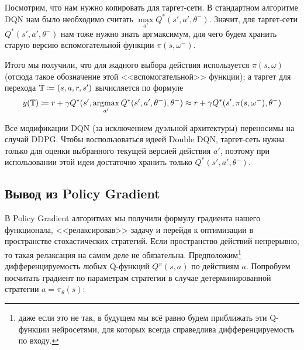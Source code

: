 Посмотрим, что нам нужно копировать для таргет-сети. В стандартном алгоритме DQN нам было необходимо считать $\max\limits_{a'} Q^*(s', a', \theta^{-})$. Значит, для таргет-сети $Q^*(s', a', \theta^{-})$ нам тоже нужно знать аргмаксимум, для чего будем хранить старую версию вспомогательной функции $\pi(s, \omega^{-})$.

Итого мы получили, что для жадного выбора действия используется $\pi(s, \omega)$ (отсюда такое обозначение этой <<вспомогательной>> функции); а таргет для перехода $\mathbb{T} \coloneqq (s, a, r, s')$ вычисляется по формуле
$$y(\mathbb{T}) \coloneqq r + \gamma Q^*(s', \mathop{\mathrm{argmax}}_{a'} Q^*(s', a', \theta^{-}), \theta^{-}) \approx r + \gamma Q^*(s', \pi(s, \omega^{-}), \theta^{-})$$

\begin{remark}
Все модификации DQN (за исключением дуэльной архитектуры) переносимы на случай DDPG. Чтобы воспользоваться идеей Double DQN, таргет-сеть нужна только для оценки выбранного текущей версией действия $a'$, поэтому при использовании этой идеи достаточно хранить только $Q^*(s', a', \theta^{-})$.
\end{remark}

\subsection{Вывод из Policy Gradient}


В Policy Gradient алгоритмах мы получили формулу градиента нашего функционала, <<релаксировав>> задачу и перейдя к оптимизации в пространстве стохастических стратегий. Если пространство действий непрерывно, то такая релаксация на самом деле не обязательна. Предположим\footnote{даже если это не так, в будущем мы всё равно будем приближать эти Q-функции нейросетями, для которых всегда справедлива дифференцируемость по входу.} дифференцируемость любых Q-функций $Q^{\pi}(s, a)$ по действиям $a$. Попробуем посчитать градиент по параметрам стратегии в случае детерминированной стратегии $a = \pi_\theta(s)$:

